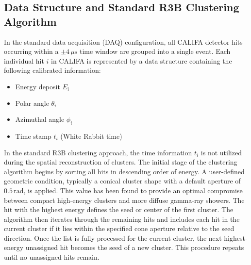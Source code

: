 \documentclass[final,5p,times,twocolumn]{elsarticle}
\begin{document}
\subsection{Data Structure and Standard R3B Clustering Algorithm}\label{s_sec:r3b_clustering}
In the standard data acquisition (DAQ) configuration, all CALIFA detector hits occurring within a $\pm 4\,\mu\mathrm{s}$ time window are grouped into a single event. Each individual hit $i$ in CALIFA is represented by a data structure containing the following calibrated information:
\begin{itemize}
    \item Energy deposit $E_i$
    \item Polar angle $\theta_i$
    \item Azimuthal angle $\phi_i$
    \item Time stamp $t_i$ (White Rabbit time)
\end{itemize}
In the standard R3B clustering approach, the time information $t_i$ is not utilized during the spatial reconstruction of clusters.\newline
The initial stage of the clustering algorithm begins by sorting all hits in descending order of energy. A user-defined geometric condition, typically a conical cluster shape with a default aperture of $0.5\,\mathrm{rad}$, is applied. This value has been found to provide an optimal compromise between compact high-energy clusters and more diffuse gamma-ray showers.\newline
The hit with the highest energy defines the seed or center of the first cluster. The algorithm then iterates through the remaining hits and includes each hit in the current cluster if it lies within the specified cone aperture relative to the seed direction. Once the list is fully processed for the current cluster, the next highest-energy unassigned hit becomes the seed of a new cluster. This procedure repeats until no unassigned hits remain.\newline
\end{document}
